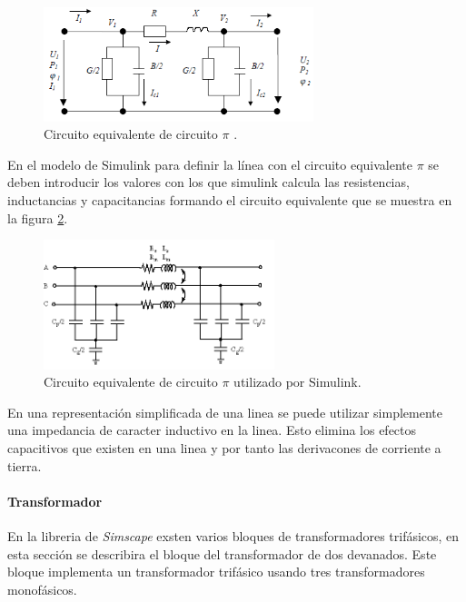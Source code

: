 \documentclass{book}
\begin{document}
\begin{figure}[h!]
\centering
\includegraphics[width=0.7\textwidth]{CircuitoPi.PNG}
\caption{Circuito equivalente de circuito $\pi$ \cite{LibroRedesLineas}. }
\label{CircuitoPi}
\end{figure} \par

En el modelo de Simulink para definir la l\'inea con el circuito equivalente  $\pi$ se deben introducir los valores con los que simulink calcula las resistencias, inductancias y capacitancias formando el circuito equivalente que se muestra en la figura \ref{PiSectionSimulink}.  \par 

\begin{figure}[h!]
\centering
\includegraphics[width=0.6\textwidth]{PiSectionSimulink.PNG}
\caption{Circuito equivalente de circuito $\pi$ utilizado por Simulink. }
\label{PiSectionSimulink}
\end{figure} \par

En una representaci\'on simplificada de una linea se puede utilizar simplemente una impedancia de caracter inductivo en la linea. Esto elimina los efectos capacitivos que existen en una linea y por tanto las derivacones de corriente a tierra. \par 

		\paragraph{Transformador}

En la libreria de \emph{Simscape} exsten varios bloques de transformadores trif\'asicos, en esta secci\'on se describira el bloque del transformador de dos devanados. Este bloque implementa un transformador trif\'asico usando tres transformadores monof\'asicos. \par
\end{document}
